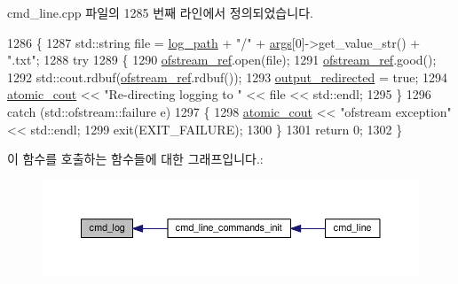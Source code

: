 cmd\+\_\+line.\+cpp 파일의 1285 번째 라인에서 정의되었습니다.


\begin{DoxyCode}
1286 \{
1287     std::string file = \hyperlink{classcmd__line_ab9a5e2965a8a7be88b0a1e296d4cc0be}{log\_path} + \textcolor{stringliteral}{"/"} + \hyperlink{namespaceastime__fitline_a8187411843a6284ffb964ef3fb9fcab3}{args}[0]->get\_value\_str() + \textcolor{stringliteral}{".txt"};
1288     \textcolor{keywordflow}{try}
1289     \{
1290         \hyperlink{classcmd__line_a8ecbb7e6f42fc1b6d974b169f0baa229}{ofstream\_ref}.open(file);
1291         \hyperlink{classcmd__line_a8ecbb7e6f42fc1b6d974b169f0baa229}{ofstream\_ref}.good();
1292         std::cout.rdbuf(\hyperlink{classcmd__line_a8ecbb7e6f42fc1b6d974b169f0baa229}{ofstream\_ref}.rdbuf());
1293         \hyperlink{classcmd__line_a4145a9821510d9b30d980e665d9bd68e}{output\_redirected} = \textcolor{keyword}{true};
1294         \hyperlink{cmd__line_8h_a0bc38ccc65c79ba06c6fcd7b4bf554c3}{atomic\_cout} << \textcolor{stringliteral}{"Re-directing logging to "} << file << std::endl;
1295     \}
1296     \textcolor{keywordflow}{catch} (std::ofstream::failure e)
1297     \{
1298         \hyperlink{cmd__line_8h_a0bc38ccc65c79ba06c6fcd7b4bf554c3}{atomic\_cout} << \textcolor{stringliteral}{"ofstream exception"} << std::endl;
1299         exit(EXIT\_FAILURE);
1300     \}
1301     \textcolor{keywordflow}{return} 0;
1302 \}
\end{DoxyCode}


이 함수를 호출하는 함수들에 대한 그래프입니다.\+:
\nopagebreak
\begin{figure}[H]
\begin{center}
\leavevmode
\includegraphics[width=350pt]{classcmd__line_aec9ae277cca4d0df74e0d830fb173a98_icgraph}
\end{center}
\end{figure}


